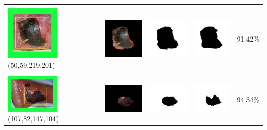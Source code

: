 \begin{table}[H]
\begin{tabular}{|m{1.0in}|m{1.0in}|m{1.0in}|m{1.0in}|m{0.6in}|}
		&  &  & \\
		\includegraphics[width=1.0in]{gambar/hasil_segmentasi/luka_hitam/image_18_rect.jpg} {\centering\fontsize{10}{10}\selectfont(50,59,219,201)}&
		\includegraphics[width=1.0in]{gambar/hasil_segmentasi/luka_hitam/result_18.jpg}&
		\includegraphics[width=1.0in]{gambar/hasil_segmentasi/luka_hitam/mask_r_18.jpg}&
		\includegraphics[width=1.0in]{gambar/hasil_segmentasi/luka_hitam/18_r.jpg}&
		91.42\% \\
		\hline
		
		&  &  & \\
		\includegraphics[width=1.0in]{gambar/hasil_segmentasi/luka_hitam/image_19_rect.jpg} {\centering\fontsize{10}{10}\selectfont(107,82,147,104)}&
		\includegraphics[width=1.0in]{gambar/hasil_segmentasi/luka_hitam/result_19.jpg}&
		\includegraphics[width=1.0in]{gambar/hasil_segmentasi/luka_hitam/mask_r_19.jpg}&
		\includegraphics[width=1.0in]{gambar/hasil_segmentasi/luka_hitam/19_r.jpg}&
		94.34\% \\
		\hline
				

\end{tabular}
\end{table}
